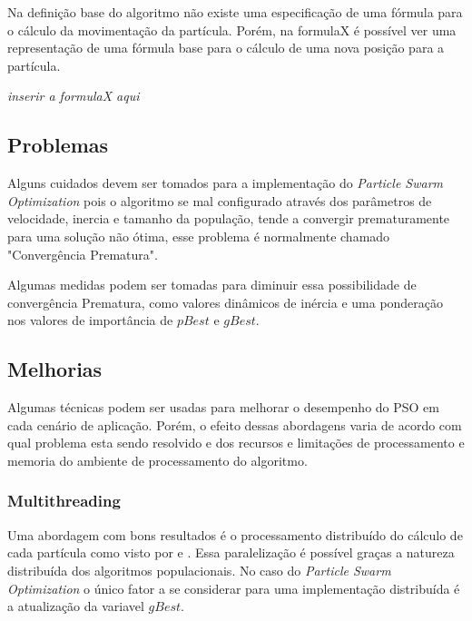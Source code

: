         Na definição base do algoritmo não existe uma especificação de uma fórmula para o cálculo da movimentação da partícula. Porém, na formulaX é possível ver uma representação de uma fórmula base para o cálculo de uma nova posição para a partícula.

        \textit{inserir a formulaX aqui}

    

    \subsection{Problemas}
        Alguns cuidados devem ser tomados para a implementação do \textit{Particle Swarm Optimization} pois o algoritmo se mal configurado através dos parâmetros de velocidade, inercia e tamanho da população, tende a convergir prematuramente para uma solução não ótima, esse problema é normalmente chamado "Convergência Prematura".\newline
        
        Algumas medidas podem ser tomadas para diminuir essa possibilidade de convergência Prematura, como valores dinâmicos de inércia e uma ponderação nos valores de importância de $pBest$ e $gBest$.


    \subsection{Melhorias}
            Algumas técnicas podem ser usadas para melhorar o desempenho do PSO em cada cenário de aplicação. Porém, o efeito dessas abordagens varia de acordo com qual problema esta sendo resolvido e dos recursos e limitações de processamento e memoria do ambiente de processamento do algoritmo.

        \subsubsection{Multithreading}
            Uma abordagem com bons resultados é o processamento distribuído do cálculo de cada partícula como visto por \cite{Thongkrairat2019} e \cite{Kim2011}. Essa paralelização é possível graças a natureza distribuída dos algoritmos populacionais. No caso do \textit{Particle Swarm Optimization} o único fator a se considerar para uma implementação distribuída é a atualização da variavel $gBest$.\newline
            
